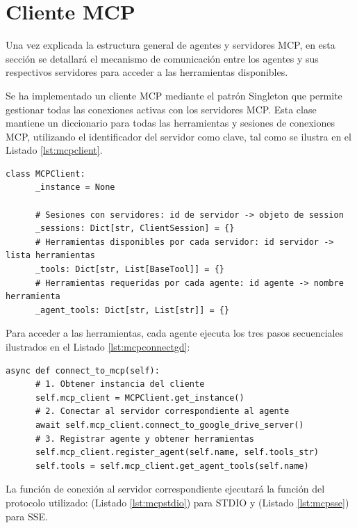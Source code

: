 \section{Cliente MCP}
\label{sec:gestionmcp}
Una vez explicada la estructura general de agentes y servidores MCP, en esta sección se detallará el mecanismo de comunicación entre los agentes y sus respectivos servidores para acceder a las herramientas disponibles.

Se ha implementado un cliente MCP mediante el patrón Singleton que permite gestionar todas las conexiones activas con los servidores MCP. Esta clase mantiene un diccionario para todas las herramientas y sesiones de conexiones MCP, utilizando el identificador del servidor como clave, tal como se ilustra en el Listado \ref{lst:mcpclient}.


\begin{lstlisting}[caption={\protect\opus{mcp_multi_client.py}: clase Singleton MCPClient},label={lst:mcpclient}]
  class MCPClient:
      _instance = None

      # Sesiones con servidores: id de servidor -> objeto de session
      _sessions: Dict[str, ClientSession] = {}
      # Herramientas disponibles por cada servidor: id servidor -> lista herramientas
      _tools: Dict[str, List[BaseTool]] = {}
      # Herramientas requeridas por cada agente: id agente -> nombre herramienta
      _agent_tools: Dict[str, List[str]] = {}
\end{lstlisting}

Para acceder a las herramientas, cada agente ejecuta los tres pasos secuenciales ilustrados en el Listado \ref{lst:mcpconnectgd}:

\begin{lstlisting}[caption={\protect\opus{google_drive_agent_graph.py}: función \protect\opus{connect_to_mcp} en agente Google Drive},label={lst:mcpconnectgd}]
  async def connect_to_mcp(self):
      # 1. Obtener instancia del cliente
      self.mcp_client = MCPClient.get_instance()
      # 2. Conectar al servidor correspondiente al agente  
      await self.mcp_client.connect_to_google_drive_server()
      # 3. Registrar agente y obtener herramientas
      self.mcp_client.register_agent(self.name, self.tools_str)
      self.tools = self.mcp_client.get_agent_tools(self.name)
\end{lstlisting}

La función de conexión al servidor correspondiente ejecutará la función del protocolo utilizado:  (Listado \ref{lst:mcpstdio}) para STDIO y  (Listado \ref{lst:mcpsse}) para SSE.


